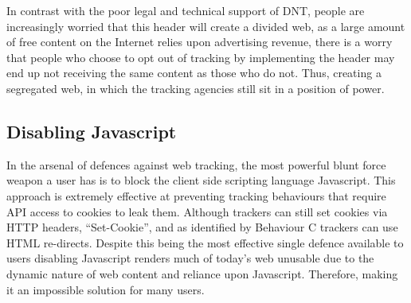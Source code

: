 \documentclass{article}
\begin{document}
In contrast with the poor legal and technical support of DNT, people are increasingly worried that this header will create a divided web, as a large amount of free content on the Internet relies upon advertising revenue, there is a worry that people who choose to opt out of tracking by implementing the header may end up not receiving the same content as those who do not. Thus, creating a segregated web, in which the tracking agencies still sit in a position of power. 

\subsection{Disabling Javascript}
In the arsenal of defences against web tracking, the most powerful blunt force weapon a user has is to block the client side scripting language Javascript. This approach is extremely effective at preventing tracking behaviours that require API access to cookies to leak them. Although trackers can still set cookies via HTTP headers, ``Set-Cookie'', and as identified by \parencite{roesner} Behaviour C trackers can use HTML re-directs. Despite this being the most effective single defence available to users disabling Javascript renders much of today's web unusable due to the dynamic nature of web content and reliance upon Javascript. Therefore, making it an impossible solution for many users. 

\medskip
\printbibliography
\end{document}
